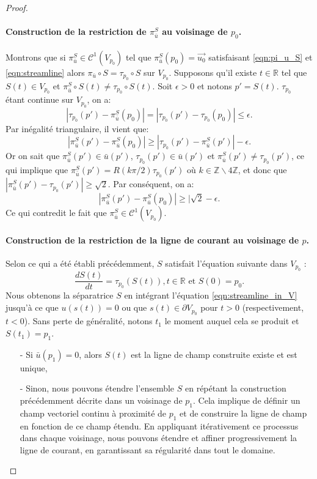\begin{proof}
\paragraph{Construction de la restriction de $\pi_{\bar{u}}^S$ au voisinage de $p_0$.}
Montrons que si $\pi_{\bar{u}}^S\in\mathcal{C}^1(V_{p_0})$ tel que $\pi_{\bar{u}}^S(p_0)=\overrightarrow{u_0}$ satisfaisant \eqref{eqn:pi_u_S} et \eqref{eqn:streamline} alors $\pi_{\bar{u}}\circ S=\tau_{p_0}\circ S$ sur $V_{p_0}$. Supposons qu'il existe $t\in\mathbb{R}$ tel que $S(t)\in V_{p_0}$ et $\pi_{\bar{u}}^S\circ S(t)\neq\tau_{p_0}\circ S(t)$. Soit $\epsilon>0$ et notons $p'=S(t)$. $\tau_{p_0}$ étant continue sur $V_{p_0}$, on a:
$$|\tau_{p_0}(p')-\pi^S_{\bar{u}}(p_0)|=|\tau_{p_0}(p')-\tau_{p_0}(p_0)|\leq\epsilon.$$
Par inégalité triangulaire, il vient que:
$$|\pi^S_{\bar{u}}(p')-\pi^S_{\bar{u}}(p_0)|\geq|\tau_{p_0}(p')-\pi^S_{\bar{u}}(p')|-\epsilon.$$
Or on sait que $\pi^S_{\bar{u}}(p')\in{\bar{u}}(p')$, $\tau_{p_0}(p')\in{\bar{u}}(p')$ et $\pi_{\bar{u}}^S(p')\neq\tau_{p_0}(p')$, ce qui implique que $\pi^S_{\bar{u}}(p')=R(k\pi/2)\tau_{p_0}(p')$ où $k\in\mathbb{Z}\backslash 4\mathbb{Z}$, et donc que $|\pi^S_{\bar{u}}(p')-\tau_{p_0}(p')|\geq\sqrt{2}$. Par conséquent, on a:
$$|\pi^S_{\bar{u}}(p')-\pi^S_{\bar{u}}(p_0)|\geq|\sqrt{2}-\epsilon.$$
Ce qui contredit le fait que $\pi_{\bar{u}}^S\in\mathcal{C}^1(V_{p_0})$.


\paragraph{Construction de la restriction de la ligne de courant au voisinage de $p$.}
Selon ce qui a été établi précédemment, $S$ satisfait l'équation suivante dans $V_{p_0}$ :\begin{equation}
\label{eqn:streamline_in_V}
\frac{dS(t)}{dt}=\tau_{p_0}(S(t)),t\in \mathbb{R} \text{ et }  S(0)=p_0.
\end{equation}
Nous obtenons la séparatrice $S$ en intégrant l'équation \eqref{eqn:streamline_in_V} jusqu'à ce que $u(s(t))=0$ ou que $s(t)\in\partial V_{p_0}$ pour $t>0$ (respectivement, $t<0$). Sans perte de généralité, notons $t_1$ le moment auquel cela se produit et $S(t_1)=p_1$.\\
\begin{itemize}
\item[-] Si $\bar{u}(p_1)=0$, alors $S(t)$ est la ligne de champ construite existe et est unique,\\
\item[-] Sinon, nous pouvons étendre l'ensemble $S$ en répétant la construction précédemment décrite dans un voisinage de $p_1$. Cela implique de définir un champ vectoriel continu à proximité de $p_1$ et de construire la ligne de champ en fonction de ce champ étendu. En appliquant itérativement ce processus dans chaque voisinage, nous pouvons étendre et affiner progressivement la ligne de courant, en garantissant sa régularité dans tout le domaine.
\end{itemize}
\end{proof}


